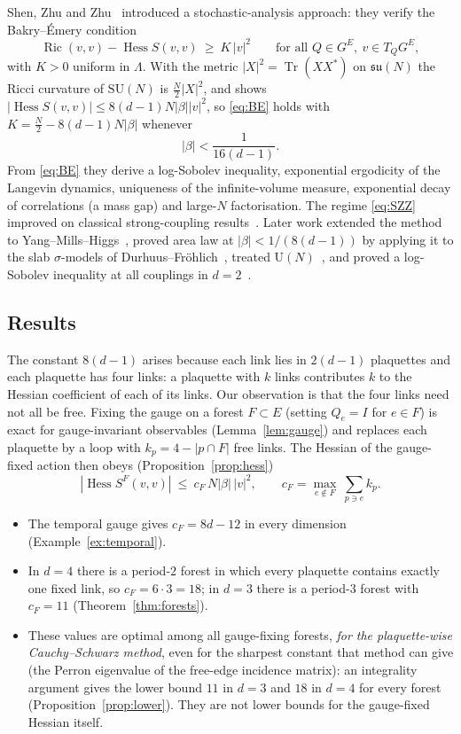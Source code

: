 \documentclass[11pt]{amsart}
\theoremstyle{definition}
\theoremstyle{remark}
\newcommand{\Tr}{\operatorname{Tr}}
\newcommand{\Hess}{\operatorname{Hess}}
\newcommand{\Ric}{\operatorname{Ric}}
\newcommand{\SU}{\mathrm{SU}}
\begin{document}
Shen, Zhu and Zhu~\cite{SZZ} introduced a stochastic-analysis approach: they verify the Bakry--\'Emery
condition~\cite{BE}
\begin{equation}\label{eq:BE}
\Ric(v,v)-\Hess S(v,v)\ \ge\ K\,|v|^2\qquad\text{for all }Q\in G^E,\ v\in T_QG^E,
\end{equation}
with $K>0$ uniform in $\Lambda$. With the metric $|X|^2=\Tr(XX^*)$ on $\mathfrak{su}(N)$ the Ricci curvature of
$\SU(N)$ is $\frac{N}{2}|X|^2$, and \cite[Lemma~4.1]{SZZ} shows $|\Hess S(v,v)|\le 8(d-1)N|\beta||v|^2$, so
\eqref{eq:BE} holds with $K=\frac{N}{2}-8(d-1)N|\beta|$ whenever
\begin{equation}\label{eq:SZZ}
|\beta|<\frac{1}{16(d-1)} .
\end{equation}
From \eqref{eq:BE} they derive a log-Sobolev inequality, exponential ergodicity of the Langevin dynamics, uniqueness of
the infinite-volume measure, exponential decay of correlations (a mass gap) and large-$N$ factorisation. The regime
\eqref{eq:SZZ} improved on classical strong-coupling results~\cite{OS}. Later work extended the method to
Yang--Mills--Higgs~\cite{SZZ24}, proved area law at $|\beta|<1/(8(d-1))$ by applying it to the slab
$\sigma$-models of Durhuus--Fr\"ohlich~\cite{DF,CNS}, treated $\mathrm{U}(N)$~\cite{Nissim}, and proved a log-Sobolev inequality at all couplings in
$d=2$~\cite{PS}.

\subsection*{Results}
The constant $8(d-1)$ arises because each link lies in $2(d-1)$ plaquettes and each plaquette has four links: a
plaquette with $k$ links contributes $k$ to the Hessian coefficient of each of its links. Our observation is that the
four links need not all be free. Fixing the gauge on a forest $F\subset E$ (setting $Q_e=I$ for $e\in F$) is exact for
gauge-invariant observables (Lemma~\ref{lem:gauge}) and replaces each plaquette by a loop with $k_p=4-|p\cap F|$ free
links. The Hessian of the gauge-fixed action then obeys (Proposition~\ref{prop:hess})
\[
|\Hess S^F(v,v)|\ \le\ c_F\,N|\beta|\,|v|^2,\qquad c_F=\max_{e\notin F}\ \sum_{p\ni e}k_p .
\]
\begin{itemize}
\item The temporal gauge gives $c_F=8d-12$ in every dimension (Example~\ref{ex:temporal}).
\item In $d=4$ there is a period-$2$ forest in which every plaquette contains exactly one fixed link, so
$c_F=6\cdot 3=18$; in $d=3$ there is a period-$3$ forest with $c_F=11$ (Theorem~\ref{thm:forests}).
\item These values are optimal among all gauge-fixing forests, \emph{for the plaquette-wise Cauchy--Schwarz
method}, even for the sharpest constant that method can give (the Perron eigenvalue of the free-edge incidence
matrix): an integrality argument gives the lower bound $11$ in $d=3$ and $18$ in $d=4$ for every forest
(Proposition~\ref{prop:lower}). They are not lower bounds for the gauge-fixed Hessian itself.
\end{itemize}
\end{document}
